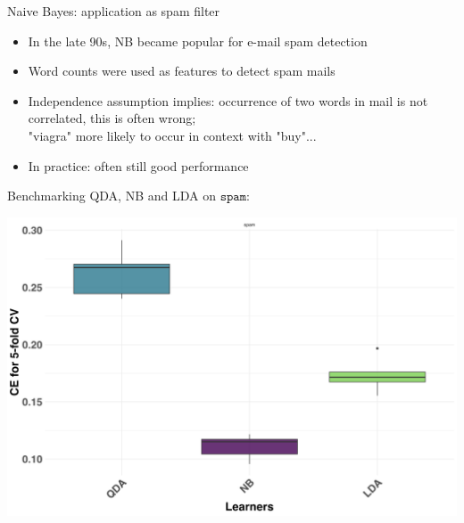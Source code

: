 \documentclass[11pt,compress,t,notes=noshow, xcolor=table]{beamer}
\begin{document}











\begin{vbframe}{Naive Bayes: application as spam filter}
\begin{itemize}
  \item In the late 90s, NB became popular for e-mail spam detection 
  \item Word counts were used as features to detect spam mails
  \item Independence assumption implies: occurrence of two words in mail is not correlated, this is often wrong; \\
  "viagra" more likely to occur in context with "buy"...
  \item In practice: often still good performance
\end{itemize}
\lz

Benchmarking QDA, NB and LDA on $\texttt{spam}$:

\begin{center}
\includegraphics[clip=true, trim={0 0 0 18}, width=0.45\linewidth]{figure/nb-bench.png}
\end{center}

\end{vbframe}

\endlecture
\end{document}

